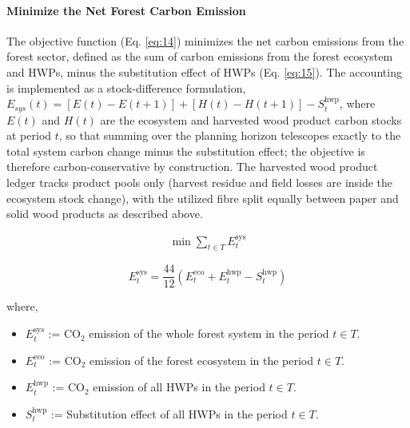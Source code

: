 \documentclass[preprint,12pt,authoryear]{elsarticle}
\begin{document}
\begin{linenumbers}
\paragraph{Minimize the Net Forest Carbon Emission}
The objective function (Eq. \ref{eq:14}) minimizes the net carbon emissions from the forest sector, defined as the sum of carbon emissions from the forest ecosystem and \acp{HWP}, minus the substitution effect of \acp{HWP} (Eq. \ref{eq:15}). 
The accounting is implemented as a stock-difference formulation, $E_{sys}(t) = [E(t) - E(t+1)] + [H(t) - H(t+1)] - S_t^{\text{hwp}}$, where $E(t)$ and $H(t)$ are the ecosystem and harvested wood product carbon stocks at period $t$, so that summing over the planning horizon telescopes exactly to the total system carbon change minus the substitution effect; the objective is therefore carbon-conservative by construction. The harvested wood product ledger tracks product pools only (harvest residue and field losses are inside the ecosystem stock change), with the utilized fibre split equally between paper and solid wood products as described above. 

\begin{align}
\min \sum_{t \in T} E_t^{\text{sys}}
\label{eq:14}
\end{align}

\begin{equation}
E_t^{\text{sys}} = \frac{44}{12}(E_t^{\text{eco}}+ E_t^{\text{hwp}} - S_t^{\text{hwp}})
\label{eq:15}
\end{equation}



where,
\begin{itemize}
    \item $E_t^{\text{sys}}$ := $ \mathrm{CO}_2 $ emission of the whole forest system in the period $t \in T$.
    \item $E_t^{\text{eco}}$ := $ \mathrm{CO}_2 $ emission of the forest ecosystem in the period $t \in T$.
    \item $E_t^{\text{hwp}}$ := $ \mathrm{CO}_2 $ emission of all \acp{HWP} in the period $t \in T$.
    \item $S_t^{\text{hwp}}$ := Substitution effect of all \acp{HWP} in the period $t \in T$.
\end{itemize}


\end{linenumbers}
\end{document}
